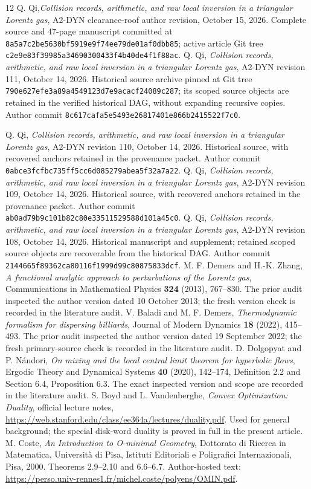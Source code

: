\documentclass[11pt,reqno]{amsart}
\numberwithin{equation}{section}
\theoremstyle{definition}\newtheorem{definition}[theorem]{Definition}
\theoremstyle{remark}\newtheorem{remark}[theorem]{Remark}
\begin{document}
\begin{thebibliography}{12}
 Q. Qi,\emph{Collision records, arithmetic, and raw local inversion in a
triangular Lorentz gas}, A2-DYN clearance-roof author revision,
October 15, 2026. Complete source and 47-page manuscript
committed at \texttt{8a5a7c2be5630bf5919e9f74ee79de01af0dbb85};
active article Git tree \texttt{c2e9e83f39985a34690300433f4b40de4f1f88ac}.
 Q. Qi,
\emph{Collision records, arithmetic, and raw local inversion in a
triangular Lorentz gas}, A2-DYN revision 111, October 14, 2026.
Historical source archive pinned at Git tree \texttt{790e627efe3a89a4549123d7e9acacf24089c287}; its scoped source objects are retained in the verified historical DAG, without expanding recursive copies.
Author commit \texttt{8c617cafa5e5493e26817401e866b2415522f7c0}.

 Q. Qi,
\emph{Collision records, arithmetic, and raw local inversion in a
triangular Lorentz gas}, A2-DYN revision 110, October 14, 2026.
Historical source, with recovered anchors retained in the provenance packet.
Author commit \texttt{0abce3fcfbc735ff5cc6d085279abea5f32a7a22}.
 Q. Qi,
\emph{Collision records, arithmetic, and raw local inversion in a
triangular Lorentz gas}, A2-DYN revision 109, October 14, 2026.
Historical source, with recovered anchors retained in the provenance packet.
Author commit \texttt{ab0ad79b9c101b82c80e33511529588d101a45c0}.
 Q. Qi,
\emph{Collision records, arithmetic, and raw local inversion in a
triangular Lorentz gas}, A2-DYN revision 108, October 14, 2026.
Historical manuscript and supplement; retained scoped source objects are recoverable from the historical DAG. Author commit
\texttt{2144665f89362ca80116f1999d99c80875833dcf}.
 M. F. Demers and H.-K. Zhang,
\emph{A functional analytic approach to perturbations of the Lorentz gas},
Communications in Mathematical Physics \textbf{324} (2013), 767--830.
The prior audit inspected the author version dated 10 October 2013; the fresh version check is recorded in the literature audit.
 V. Baladi and M. F. Demers,
\emph{Thermodynamic formalism for dispersing billiards},
Journal of Modern Dynamics \textbf{18} (2022), 415--493.
The prior audit inspected the author version dated 19 September 2022; the fresh primary-source check is recorded in the literature audit.
 D. Dolgopyat and P. N\'andori,
\emph{On mixing and the local central limit theorem for hyperbolic flows},
Ergodic Theory and Dynamical Systems \textbf{40} (2020), 142--174,
Definition 2.2 and Section 6.4, Proposition 6.3. The exact inspected
version and scope are recorded in the literature audit.
 S. Boyd and L. Vandenberghe,
\emph{Convex Optimization: Duality}, official lecture notes,
\url{https://web.stanford.edu/class/ee364a/lectures/duality.pdf}.
Used for general background; the special disk-word duality is proved
in full in the present article.
 M. Coste,
\emph{An Introduction to O-minimal Geometry},
Dottorato di Ricerca in Matematica, Universit\`a di Pisa,
Istituti Editoriali e Poligrafici Internazionali, Pisa, 2000.
Theorems 2.9--2.10 and 6.6--6.7.
Author-hosted text:
\url{https://perso.univ-rennes1.fr/michel.coste/polyens/OMIN.pdf}.
\end{thebibliography}
\end{document}
